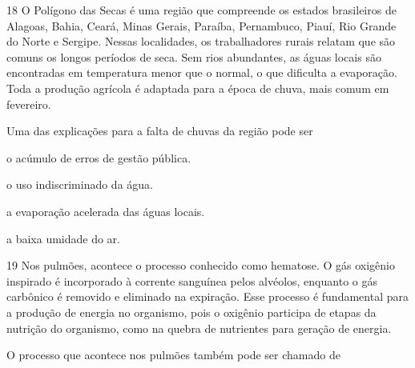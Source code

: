 
\num{18} O Polígono das Secas é uma região que compreende os estados
brasileiros de Alagoas, Bahia, Ceará, Minas Gerais, Paraíba, Pernambuco,
Piauí, Rio Grande do Norte e Sergipe. Nessas localidades, os
trabalhadores rurais relatam que são comuns os longos períodos de seca.
Sem rios abundantes, as águas locais são encontradas em temperatura
menor que o normal, o que dificulta a evaporação. Toda a produção
agrícola é adaptada para a época de chuva, mais comum em fevereiro.

Uma das explicações para a falta de chuvas da região pode ser

\begin{minipage}{.5\textwidth}
\begin{escolha}
\item o acúmulo de erros de gestão pública.

\item o uso indiscriminado da água.

\item a evaporação acelerada das águas locais.

\item a baixa umidade do ar.
\end{escolha}
\end{minipage}

\num{19} Nos pulmões, acontece o processo conhecido como hematose. O
gás oxigênio inspirado é incorporado à corrente sanguínea pelos
alvéolos, enquanto o gás carbônico é removido e eliminado na expiração.
Esse processo é fundamental para a produção de energia no organismo,
pois o oxigênio participa de etapas da nutrição do organismo, como na
quebra de nutrientes para geração de energia.

O processo que acontece nos pulmões também pode ser chamado de

